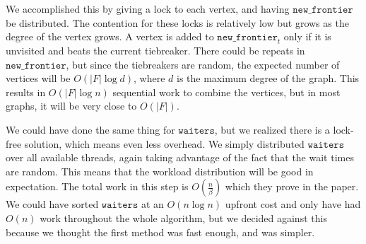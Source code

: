 \documentclass[11pt]{scrartcl}
\theoremstyle{plain}
\theoremstyle{definition}
\theoremstyle{remark}
\newcommand{\waiters}{\texttt{waiters}}
\begin{document}
\par We accomplished this by giving a lock to each vertex, and having $\texttt{new\_frontier}$ be distributed. The contention for these locks is relatively low but grows as the degree of the vertex grows. A vertex is added to $\texttt{new\_frontier}_t$ only if it is unvisited and beats the current tiebreaker. There could be repeats in $\texttt{new\_frontier}$, but since the tiebreakers are random, the expected number of vertices will be $O(|F|\log d)$, where $d$ is the maximum degree of the graph. This results in $O(|F|\log n)$ sequential work to combine the vertices, but in most graphs, it will be very close to $O(|F|)$.

\par
We could have done the same thing for $\waiters$, but we realized there is a lock-free solution, which means even less overhead. We simply distributed $\waiters$ over all available threads, again taking advantage of the fact that the wait times are random. This means that the workload distribution will be good in expectation. The total work in this step is $O(\frac{n}{\beta})$ which they prove in the paper. We could have sorted $\waiters$ at an $O(n \log n)$ upfront cost and only have had $O(n)$ work throughout the whole algorithm, but we decided against this because we thought the first method was fast enough, and was simpler.
\end{document}
